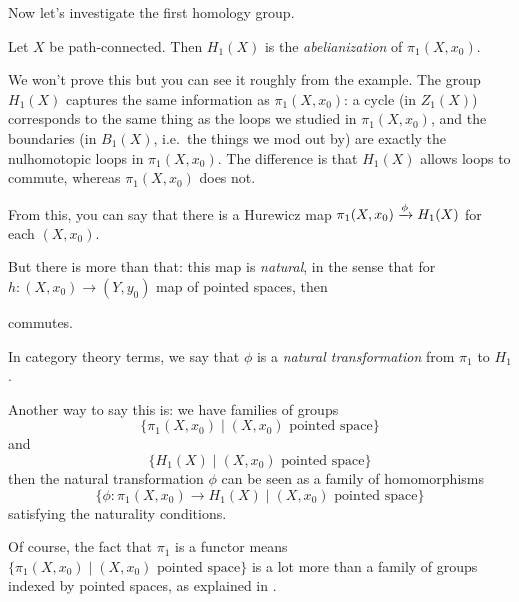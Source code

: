 Now let's investigate the first homology group.
\begin{theorem}
	\label{thm:hurewicz}
	Let $X$ be path-connected.
	Then $H_1(X)$ is the \emph{abelianization} of $\pi_1(X, x_0)$.
\end{theorem}
We won't prove this but you can see it roughly from the example.
The group $H_1(X)$ captures the same information
as $\pi_1(X, x_0)$: a cycle (in $Z_1(X)$) corresponds to the same thing
as the loops we studied in $\pi_1(X, x_0)$,
and the boundaries (in $B_1(X)$, i.e.\ the things we mod out by)
are exactly the nulhomotopic loops in $\pi_1(X, x_0)$.
The difference is that $H_1(X)$ allows loops to commute,
whereas $\pi_1(X, x_0)$ does not.

\begin{remark}
	\label{remark:hurewicz}
	From this, you can say that there is a Hurewicz map $\pi_1(X, x_0) \xrightarrow{\phi} H_1(X)$
	for each $(X, x_0)$.

	But there is more than that: this map is \emph{natural}, in the sense that for $h \colon (X,
	x_0) \to (Y, y_0)$ map of pointed spaces, then
	\begin{center}
	\end{center}
	commutes.

	In category theory terms, we say that $\phi$ is a \emph{natural transformation}
	from $\pi_1$ to $H_1$.

	Another way to say this is: we have families of groups
	\[ \{ \pi_1(X, x_0) \mid (X, x_0)\text{ pointed space} \} \]
	and
	\[ \{ H_1(X) \mid (X, x_0)\text{ pointed space} \} \]
	then the natural transformation $\phi$ can be seen as a family of homomorphisms
	\[ \{ \phi \colon \pi_1(X, x_0) \to H_1(X) \mid (X, x_0)\text{ pointed space} \} \]
	satisfying the naturality conditions.

	Of course, the fact that $\pi_1$ is a functor means
	$\{ \pi_1(X, x_0) \mid (X, x_0)\text{ pointed space} \}$ is a lot more than a family of groups
	indexed by pointed spaces, as explained in .
\end{remark}

